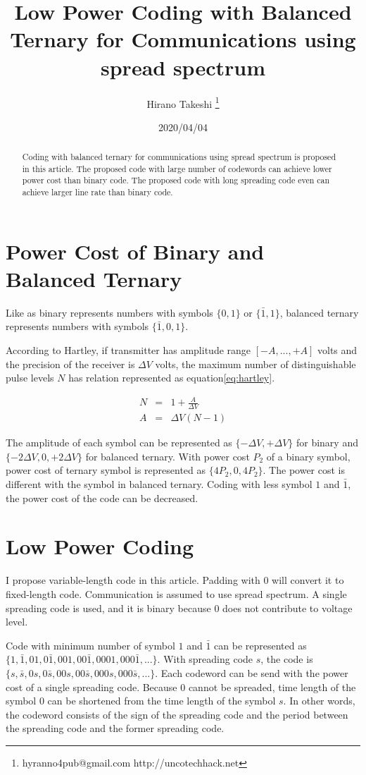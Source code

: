 \documentclass[dvipdfmx]{article}
\title{Low Power Coding with Balanced Ternary for Communications using spread spectrum}
\author{Hirano Takeshi \thanks{hyranno4pub@gmail.com http://uncotechhack.net}}
\date{2020/04/04}
\begin{document}
\maketitle

\begin{abstract}
Coding with balanced ternary for communications using spread spectrum is proposed in this article.
The proposed code with large number of codewords can achieve lower power cost than binary code.
The proposed code with long spreading code even can achieve larger line rate than binary code.
\end{abstract}


\section{Power Cost of Binary and Balanced Ternary}
Like as binary represents numbers with symbols $\{ 0,1\}$ or $\{ \bar{1}, 1\}$,
 balanced ternary represents numbers with symbols $\{ \bar{1}, 0, 1\}$.

According to Hartley,
 if transmitter has amplitude range $\left[ -A, ... , +A \right]$ volts and the precision of the receiver is $\Delta V$ volts,
 the maximum number of distinguishable pulse levels $N$ has relation represented as equation\ref{eq:hartley}.

\begin{eqnarray}
	N &=& 1+\frac{A}{\Delta V} \nonumber \\
	A &=& \Delta V(N-1)
	\label{eq:hartley}
\end{eqnarray}

The amplitude of each symbol can be represented as
 $\{-\Delta V, +\Delta V \}$ for binary and
 $\{-2\Delta V, 0, +2\Delta V \}$ for balanced ternary.
With power cost $P_{2}$ of a binary symbol, power cost of ternary symbol is represented as $\{ 4P_{2}, 0, 4P_{2} \}$.
The power cost is different with the symbol in balanced ternary.
Coding with less symbol $1$ and $\bar{1}$, the power cost of the code can be decreased.


\section{Low Power Coding}
I propose variable-length code in this article.
Padding with $0$ will convert it to fixed-length code.
Communication is assumed to use spread spectrum.
A single spreading code is used, and it is binary because $0$ does not contribute to voltage level.

Code with minimum number of symbol $1$ and $\bar{1}$ can be represented as
 $\{ 1, \bar{1}, 01, 0\bar{1}, 001, 00\bar{1}, 0001, 000\bar{1}, ... \}$.
With spreading code $s$, the code is
 $\{ s, \bar{s}, 0s, 0\bar{s}, 00s, 00\bar{s}, 000s, 000\bar{s}, ... \}$.
Each codeword can be send with the power cost of a single spreading code.
Because $0$ cannot be spreaded,
 time length of the symbol $0$ can be shortened from the time length of the symbol $s$.
In other words, the codeword consists of
 the sign of the spreading code and
 the period between the spreading code and the former spreading code.
\end{document}
